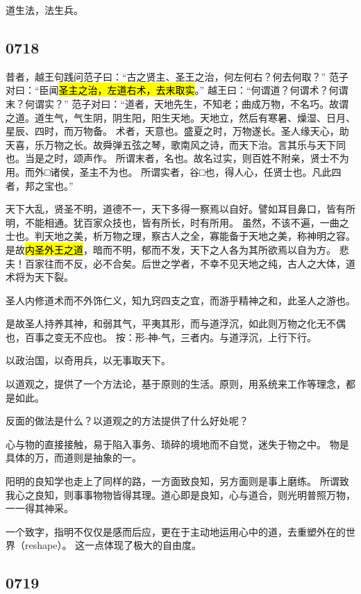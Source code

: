 道生法，法生兵。

\subsection{0718}

昔者，越王句践问范子曰：“古之贤主、圣王之治，何左何右？何去何取？”
范子对曰：“臣闻\hl{圣主之治，左道右术，去末取实}。”
越王曰：“何谓道？何谓术？何谓末？何谓实？”
范子对曰：“道者，天地先生，不知老；曲成万物，不名巧。故谓之道。道生气，气生阴，阴生阳，阳生天地。天地立，然后有寒暑、燥湿、日月、星辰、四时，而万物备。
术者，天意也。盛夏之时，万物遂长。圣人缘天心，助天喜，乐万物之长。故舜弹五弦之琴，歌南风之诗，而天下治。言其乐与天下同也。当是之时，颂声作。
所谓末者，名也。故名过实，则百姓不附亲，贤士不为用。而外□诸侯，圣主不为也。
所谓实者，谷□也，得人心，任贤士也。凡此四者，邦之宝也。”

天下大乱，贤圣不明，道德不一，天下多得一察焉以自好。譬如耳目鼻口，皆有所明，不能相通。犹百家众技也，皆有所长，时有所用。
虽然，不该不遍，一曲之士也。判天地之美，析万物之理，察古人之全，寡能备于天地之美，称神明之容。
是故\hl{内圣外王之道}，暗而不明，郁而不发，天下之人各为其所欲焉以自为方。
悲夫！百家往而不反，必不合矣。后世之学者，不幸不见天地之纯，古人之大体，道术将为天下裂。

圣人内修道术而不外饰仁义，知九窍四支之宜，而游乎精神之和，此圣人之游也。

是故圣人持养其神，和弱其气，平夷其形，而与道浮沉，如此则万物之化无不偶也，百事之变无不应也。
按：形-神-气，三者内。与道浮沉，上行下行。

以政治国，以奇用兵，以无事取天下。

以道观之，提供了一个方法论，基于原则的生活。原则，用系统来工作等理念，都是如此。

反面的做法是什么？以道观之的方法提供了什么好处呢？

心与物的直接接触，易于陷入事务、琐碎的境地而不自觉，迷失于物之中。
物是具体的万，而道则是抽象的一。

阳明的良知学也走上了同样的路，一方面致良知，另方面则是事上磨练。
所谓致我心之良知，则事事物物皆得其理。道心即是良知，心与道合，则光明普照万物，一一得其神采。

一个致字，指明不仅仅是感而后应，更在于主动地运用心中的道，去重塑外在的世界（reshape）。
这一点体现了极大的自由度。

\subsection{0719}

